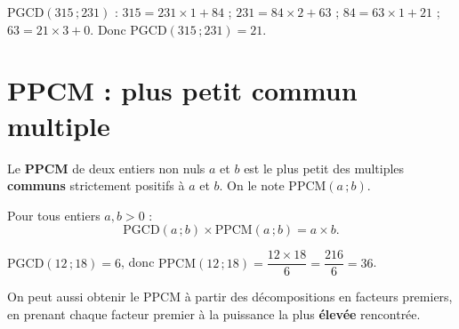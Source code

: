\begin{illus}
\end{illus}

\begin{exemple}
$\text{PGCD}(315\,;231)$ : $315=231\times1+84$ ; $231=84\times2+63$ ; $84=63\times1+21$ ;
$63=21\times3+0$. Donc $\text{PGCD}(315\,;231)=21$.
\end{exemple}

\section{PPCM : plus petit commun multiple}

\begin{definition}[PPCM]
Le \textbf{PPCM} de deux entiers non nuls $a$ et $b$ est le plus petit des multiples
\textbf{communs} strictement positifs à $a$ et $b$. On le note $\text{PPCM}(a\,;b)$.
\end{definition}

\begin{propriete}
Pour tous entiers $a,b>0$ :
\[
\text{PGCD}(a\,;b)\times\text{PPCM}(a\,;b)=a\times b.
\]
\end{propriete}

\begin{exemple}
$\text{PGCD}(12\,;18)=6$, donc
$\text{PPCM}(12\,;18)=\dfrac{12\times18}6=\dfrac{216}6=36$.
\end{exemple}

\begin{remarque}
On peut aussi obtenir le PPCM à partir des décompositions en facteurs premiers, en prenant
chaque facteur premier à la puissance la plus \textbf{élevée} rencontrée.
\end{remarque}

